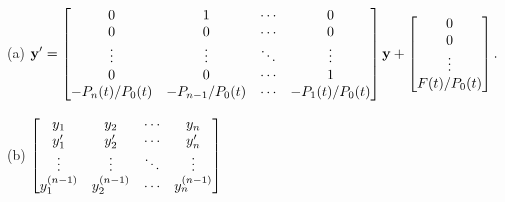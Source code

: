  (a) $\displaystyle{\mathbf{y}'=
\begin{bmatrix} 0&1&\cdots&0\\0&0&\cdots&0\\
\vdots&\vdots&\ddots&\vdots\\0&0&\cdots&1\\
-P_n(t)/P_0(t)&-P_{n-1}/P_0(t)&
\cdots&-P_1(t)/P_0(t)\end{bmatrix}\mathbf{y}+
\begin{bmatrix} 0\\0\\\vdots\\F(t)/P_0(t)\end{bmatrix}.}$

(b) ${\displaystyle{\begin{bmatrix}
y_1&y_2&\cdots&y_n\\y_1'&y_2'&\cdots&y_n'\\
\vdots&\vdots&\ddots&\vdots\\y_1^{(n-1)}&y_2^{(n-1)}&\cdots&y_n^{(n-1)}
\end{bmatrix}}}$
